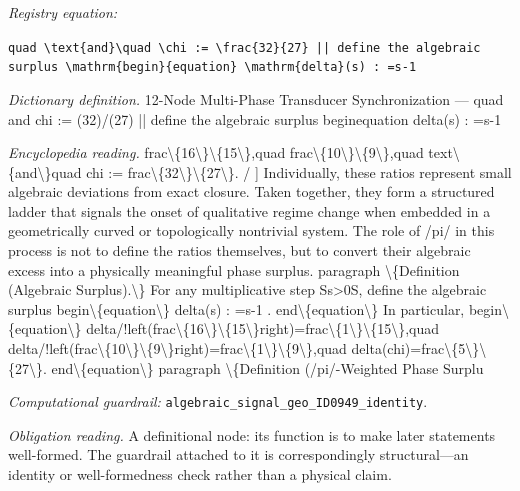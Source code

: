 \documentclass[11pt]{article}
\theoremstyle{remark}
\begin{document}
\noindent\textit{Registry equation:}\par
{\small\texttt{quad \textbackslash{}text\{and\}\textbackslash{}quad \textbackslash{}chi := \textbackslash{}frac\{32\}\{27\} || define the algebraic surplus \textbackslash{}mathrm\{begin\}\{equation\} \textbackslash{}mathrm\{delta\}(s) : =s-1}}\par\medskip
\noindent\textit{Dictionary definition.} 12-Node Multi-Phase Transducer Synchronization --- quad and chi := (32)/(27) || define the algebraic surplus beginequation delta(s) : =s-1\par\medskip
\noindent\textit{Encyclopedia reading.} frac\textbackslash{}\{16\textbackslash{}\}\textbackslash{}\{15\textbackslash{}\},quad frac\textbackslash{}\{10\textbackslash{}\}\textbackslash{}\{9\textbackslash{}\},quad text\textbackslash{}\{and\textbackslash{}\}quad chi := frac\textbackslash{}\{32\textbackslash{}\}\textbackslash{}\{27\textbackslash{}\}. / ] Individually, these ratios represent small algebraic deviations from exact closure. Taken together, they form a structured ladder that signals the onset of qualitative regime change when embedded in a geometrically curved or topologically nontrivial system. The role of /pi/ in this process is not to define the ratios themselves, but to convert their algebraic excess into a physically meaningful phase surplus. paragraph \textbackslash{}\{Definition (Algebraic Surplus).\textbackslash{}\} For any multiplicative step Ss>0S, define the algebraic surplus begin\textbackslash{}\{equation\textbackslash{}\} delta(s) : =s-1 . end\textbackslash{}\{equation\textbackslash{}\} In particular, begin\textbackslash{}\{equation\textbackslash{}\} delta/!left(frac\textbackslash{}\{16\textbackslash{}\}\textbackslash{}\{15\textbackslash{}\}right)=frac\textbackslash{}\{1\textbackslash{}\}\textbackslash{}\{15\textbackslash{}\},quad delta/!left(frac\textbackslash{}\{10\textbackslash{}\}\textbackslash{}\{9\textbackslash{}\}right)=frac\textbackslash{}\{1\textbackslash{}\}\textbackslash{}\{9\textbackslash{}\},quad delta(chi)=frac\textbackslash{}\{5\textbackslash{}\}\textbackslash{}\{27\textbackslash{}\}. end\textbackslash{}\{equation\textbackslash{}\} paragraph \textbackslash{}\{Definition (/pi/-Weighted Phase Surplu
\par\medskip\noindent\textit{Computational guardrail:} \texttt{algebraic\_signal\_geo\_ID0949\_identity}.
\par\medskip\noindent\textit{Obligation reading.} A definitional node: its function is to make later statements well-formed. The guardrail attached to it is correspondingly structural---an identity or well-formedness check rather than a physical claim.
\end{document}
